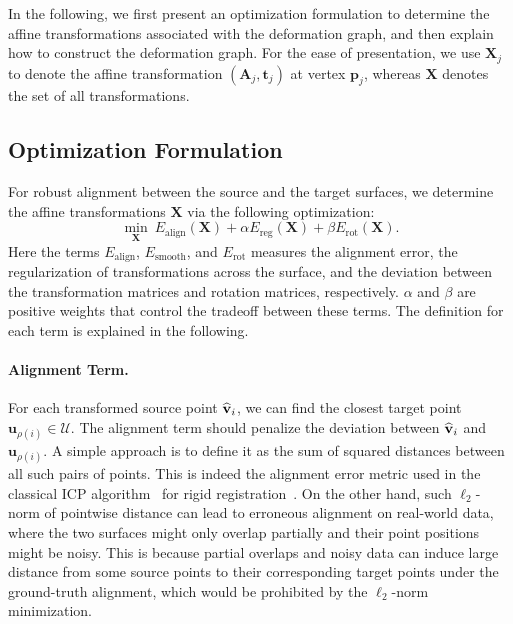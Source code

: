In the following, we first present an optimization formulation to determine the affine transformations associated with the deformation graph, and then explain how to construct the deformation graph. For the ease of presentation, we use $\mathbf{X}_j$ to denote the affine transformation $(\mathbf{A}_j, \mathbf{t}_j)$ at vertex $\mathbf{p}_j$, whereas $\mathbf{X}$ denotes the set of all transformations.


\subsection{Optimization Formulation}
\label{seq:model}

For robust alignment between the source and the target surfaces, we determine the affine transformations $\mathbf{X}$ via the following optimization:
\begin{equation}
\min_{\mathbf{X}}~ E_{\text{align}}(\mathbf{X}) + \alpha E_{\text{reg}}(\mathbf{X}) + \beta E_{\text{rot}}(\mathbf{X}).
\label{eq:model}
\end{equation}
Here the terms $E_{\text{align}}$, $E_{\text{smooth}}$, and $E_{\text{rot}}$ measures the alignment error, the regularization of transformations across the surface, and the deviation between the transformation matrices and rotation matrices, respectively. $\alpha$ and $\beta$ are positive weights that control the tradeoff between these terms. The definition for each term is explained in the following.



\paragraph{Alignment Term.}
For each transformed source point $\widehat{\mathbf{v}}_i$, we can find the closest target point $\mathbf{u}_{\rho(i)} \in \mathcal{U}$. The alignment term should penalize the deviation between $\widehat{\mathbf{v}}_i$ and $\mathbf{u}_{\rho(i)}$.
A simple approach is to define it as the sum of squared distances between all such pairs of points. This is indeed the alignment error metric used in the classical ICP algorithm~\cite{BeslM92} for rigid registration~\cite{Mitra2004}. On the other hand, such $\ell_2$-norm of pointwise distance can lead to erroneous alignment on real-world data, where the two surfaces might only overlap partially and their point positions might be noisy. This is because partial overlaps and noisy data can induce large distance from some source points to their corresponding target points under the ground-truth alignment, which would be prohibited by the $\ell_2$-norm minimization.

